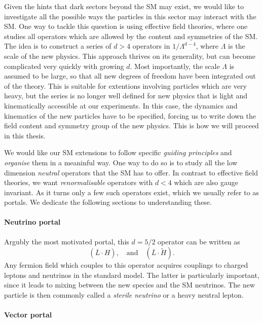 Given the hints that dark sectors beyond the SM may exist, we would like to investigate all the possible ways the particles in this sector may interact with the SM. One way to tackle this question is using effective field theories, where one studies all operators which are allowed by the content and symmetries of the SM. The idea is to construct a series of $d>4$ operators in $1/\Lambda^{d-4}$, where $\Lambda$ is the scale of the new physics. This approach thrives on its generality, but can become complicated very quickly with growing $d$. Most importantly, the scale $\Lambda$ is assumed to be large, so that all new degrees of freedom have been integrated out of the theory. This is suitable for extentions involving particles which are very heavy, but the series is no longer well defined for new physics that is light and kinematically accessible at our experiments. In this case, the dynamics and kinematics of the new particles have to be specified, forcing us to write down the field content and symmetry group of the new physics. This is how we will proceed in this thesis.

We would like our SM extensions to follow specific \emph{guiding principles} and \emph{organise} them in a meaninful way. One way to do so is to study all the low dimension \emph{neutral} operators that the SM has to offer. In contrast to effective field theories, we want \emph{renormalisable} operators with $d<4$ which are also gauge invariant. As it turns only a few such operators exist, which we usually refer to as portals. We dedicate the following sections to understanding these.

\paragraph{Neutrino portal} 

Argubly the most motivated portal, this $d=5/2$ operator can be written as
\begin{equation}
 \left( \overline{L} \cdot H\right), \quad \mathrm{and}\quad \left( \overline{L} \cdot \tilde{H}\right).
\end{equation}
Any fermion field which couples to this operator acquires couplings to charged leptons and neutrinos in the standard model. The latter is particularly important, since it leads to mixing between the new species and the SM neutrinos. The new particle is then commonly called a \emph{sterile neutrino} or a heavy neutral lepton.

\paragraph{Vector portal}

